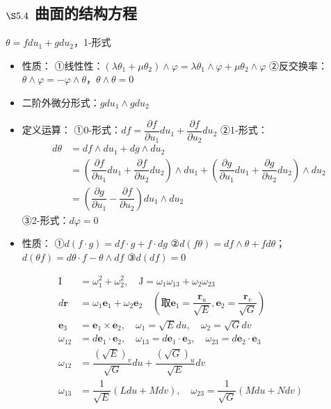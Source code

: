\documentclass{article}
\begin{document}
	\subsection{$\S5.4$ 曲面的结构方程}
	$\theta=fdu_1+gdu_2$，1-形式
	\begin{itemize}
		\item 性质：
		①线性性：$(\lambda\theta_1+\mu\theta_2)\wedge\varphi=\lambda\theta_1\wedge\varphi+\mu\theta_2\wedge\varphi$
		②反交换率：$\theta\wedge\varphi=-\varphi\wedge\theta$，$\theta\wedge\theta=0$
		\item 二阶外微分形式：$gdu_1\wedge gdu_2$
		\item 定义运算：
		①0-形式：$df=\dfrac{\partial f}{\partial u_1}du_1+\dfrac{\partial f}{\partial u_2}du_2$
		②1-形式：
		\[
		\begin{aligned}
			d\theta&=df\wedge du_1+dg\wedge du_2\\
			&=\left(\dfrac{\partial f}{\partial u_1}du_1+\dfrac{\partial f}{\partial u_2}du_2\right)\wedge du_1+\left(\dfrac{\partial g}{\partial u_1}du_1+\dfrac{\partial g}{\partial u_2}du_2\right)\wedge du_2\\
			&=\left(\dfrac{\partial g}{\partial u_1}-\dfrac{\partial f}{\partial u_2}\right)du_1\wedge du_2
		\end{aligned}
		\]
		③2-形式：$d\varphi=0$
		\item 性质：
		①$d(f\cdot g)=df\cdot g+f\cdot dg$
		②$d(f\theta)=df\wedge\theta+f d\theta$；$d(\theta f)=d\theta\cdot f-\theta\wedge df$
		③$d(df)=0$
	\end{itemize}
	\[
	\begin{aligned}
		\mathrm{I}&=\omega_1^2+\omega_2^2,\quad\mathrm{J}=\omega_1\omega_{13}+\omega_2\omega_{23}\\
		d\boldsymbol{r}&=\omega_1\boldsymbol{e}_1+\omega_2\boldsymbol{e}_2\quad\left(\text{取}\boldsymbol{e}_1=\dfrac{\boldsymbol{r}_u}{\sqrt{E}},\boldsymbol{e}_2=\dfrac{\boldsymbol{r}_v}{\sqrt{G}}\right)\\
		\boldsymbol{e}_3&=\boldsymbol{e}_1\times\boldsymbol{e}_2,\quad\omega_1=\sqrt{E}du,\quad\omega_2=\sqrt{G}dv\\
		\omega_{12}&=d\boldsymbol{e}_1\cdot\boldsymbol{e}_2,\quad\omega_{13}=d\boldsymbol{e}_1\cdot\boldsymbol{e}_3,\quad\omega_{23}=d\boldsymbol{e}_2\cdot\boldsymbol{e}_3\\
		\omega_{12}&=\dfrac{(\sqrt{E})_v}{\sqrt{G}}du+\dfrac{(\sqrt{G})_u}{\sqrt{E}}dv\\
		\omega_{13}&=\dfrac{1}{\sqrt{E}}(Ldu+Mdv),\quad\omega_{23}=\dfrac{1}{\sqrt{G}}(Mdu+Ndv)
	\end{aligned}
	\]
	
\end{document}

